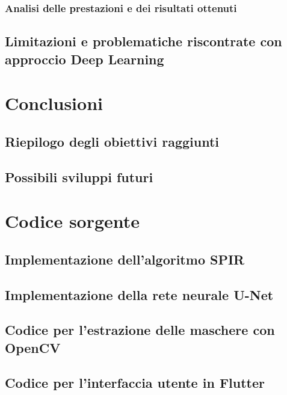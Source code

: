 \documentclass[a4paper,12pt]{report}
\begin{document}
\subsection{Analisi delle prestazioni e dei risultati ottenuti}
\section{Limitazioni e problematiche riscontrate con approccio Deep Learning}

\chapter{Conclusioni}
\section{Riepilogo degli obiettivi raggiunti}
\section{Possibili sviluppi futuri}

\chapter{Codice sorgente}
\section{Implementazione dell'algoritmo SPIR}
\section{Implementazione della rete neurale U-Net}
\section{Codice per l'estrazione delle maschere con OpenCV}
\section{Codice per l'interfaccia utente in Flutter}
\end{document}
